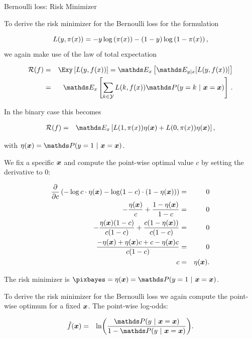 \begin{vbframe}{Bernoulli loss: Risk Minimizer}

To derive the risk minimizer for the Bernoulli loss for the formulation 

$$
  L(y, \pi(x)) = - y \log \left(\pi(x)\right) - (1 - y) \log \left(1 - \pi(x)\right),
$$
we again make use of the law of total expectation

\begin{eqnarray*}
  \riskf  & = & \Exy\left[\Lxy\right] = \E_x \left[ \E_{y|x} [ L(y, \fx) ] \right] \\
          & = & \E_x \left[\sum_{k \in \Yspace} L(k, \fx) \P(y = k~|~ \xv = \xv)\right]\,. 
\end{eqnarray*}

In the binary case this becomes 

\begin{eqnarray*}
  \riskf &=& \E_x \left[L(1, \pix) \eta(\xv) + L(0, \pix) \eta(\xv) \right],
\end{eqnarray*}

with $\eta(\xv) = \P(y = 1 ~|~ \xv = \xv)$. 

\framebreak 

We fix a specific $\bm{x}$ and compute the point-wise optimal value $c$ by setting the derivative to $0$: 

\begin{eqnarray*}
  \frac{\partial }{\partial c} \left(- \log c  \cdot \eta(\bm{x})- \log (1 - c) \cdot (1 - \eta(\bm{x}))\right) &=& 0 \\
  - \frac{\eta(\bm{x})}{c} + \frac{1 - \eta(\bm{x})}{1 - c} &=& 0 \\
  - \frac{\eta(\bm{x}) (1 - c)}{c (1 - c)} + \frac{c(1 - \eta(\bm{x}))}{c(1 - c)} &=& 0 \\
  \frac{- \eta(\bm{x}) + \eta(\bm{x}) c + c - \eta(\bm{x}) c}{c (1 - c)} &=& 0 \\
  c &=& \eta(\bm{x}). 
\end{eqnarray*}

The risk minimizer is $\pixbayes = \eta(\xv) = \P(y = 1 ~|~ \xv = \xv)$. 

\framebreak 


To derive the risk minimizer for the Bernoulli loss we again compute the point-wise optimum for a fixed $\bm{x}$. The point-wise log-odds:

\begin{eqnarray*}
\fh(\xv) &=&  \ln \biggl(\frac{\P(y~|~\xv = \xv)}{1-\P(y~|~\xv = \xv)}\biggr).
\end{eqnarray*}


\end{vbframe}
